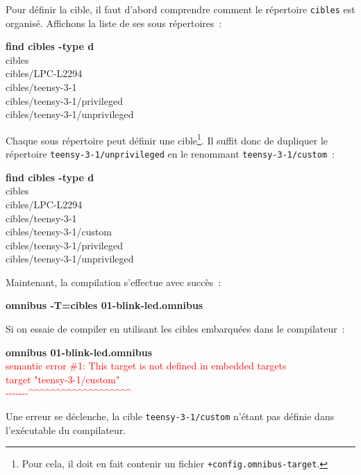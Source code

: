 Pour définir la cible, il faut d'abord comprendre comment le répertoire \texttt{cibles} est organisé. Affichons la liste de ses sous répertoires~:
\begin{SHELL}
{\bfseries find cibles -type d}\\
cibles\\
cibles/LPC-L2294\\
cibles/teensy-3-1\\
cibles/teensy-3-1/privileged\\
cibles/teensy-3-1/unprivileged
\end{SHELL}

Chaque sous répertoire peut définir une cible\footnote{Pour cela, il doit en fait contenir un fichier \texttt{+config.omnibus-target}.}. Il suffit donc de dupliquer le répertoire \texttt{teensy-3-1/unprivileged} en le renommant \texttt{teensy-3-1/custom}~:
\begin{SHELL}
{\bfseries find cibles -type d}\\
cibles\\
cibles/LPC-L2294\\
cibles/teensy-3-1\\
cibles/teensy-3-1/custom\\
cibles/teensy-3-1/privileged\\
cibles/teensy-3-1/unprivileged
\end{SHELL}

Maintenant, la compilation s'effectue avec succès~:
\begin{SHELL}
{\bfseries omnibus -T=cibles 01-blink-led.omnibus}
\end{SHELL}

Si on essaie de compiler en utilisant les cibles embarquées dans le compilateur~:
\begin{SHELL}
{\bfseries omnibus 01-blink-led.omnibus}\\
\textcolor{red}{semantic error \#1: This target is not defined in embedded targets}\\
\textcolor{red}{target "teensy-3-1/custom"}\\
\textcolor{red}{-{}-{}-{}-{}-{}-{}-\^{}\^{}\^{}\^{}\^{}\^{}\^{}\^{}\^{}\^{}\^{}\^{}\^{}\^{}\^{}\^{}\^{}\^{}\^{}}
\end{SHELL}

Une erreur se déclenche, la cible \texttt{teensy-3-1/custom} n'étant pas définie dans l'exécutable du compilateur.







